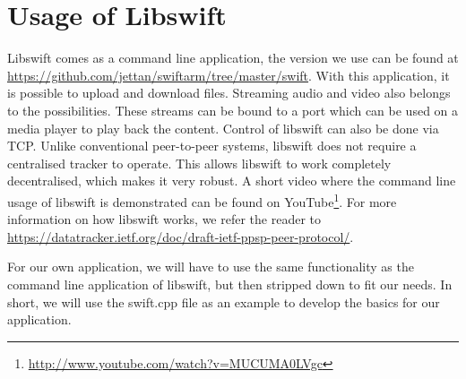 \chapter{Usage of Libswift}

Libswift comes as a command line application, the version we use can be 
found at 
\url{https://github.com/jettan/swiftarm/tree/master/swift}. With 
this application, it is possible to upload and download files. Streaming 
audio and video also belongs to the possibilities. These streams can be 
bound to a port which can be used on a media player to play back the 
content. Control of libswift can also be done via TCP.
Unlike conventional peer-to-peer systems, libswift does not require a centralised tracker to operate.
This allows libswift to work completely decentralised, which makes it very robust.
A short video where the command line usage of libswift is 
demonstrated can be found on YouTube\footnote{\url{http://www.youtube.com/watch?v=MUCUMA0LVgc}}. For more 
information on how libswift works, we refer the reader to 
\url{https://datatracker.ietf.org/doc/draft-ietf-ppsp-peer-protocol/}.

For our own application, we will have to use the same functionality as 
the command line application of libswift, but then stripped down to fit 
our needs. In short, we will use the swift.cpp file as an example to 
develop the basics for our application.
